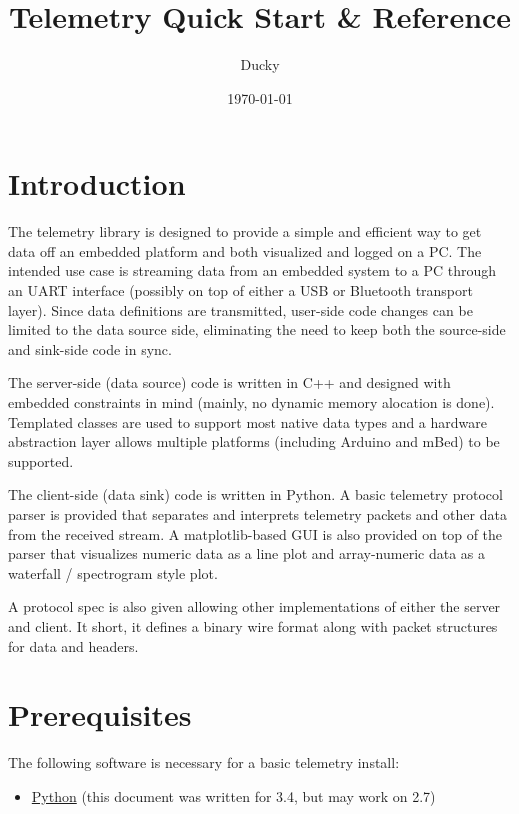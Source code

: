 \documentclass[11pt]{article}
\title{\textbf{Telemetry Quick Start \& Reference}}
\author{Ducky}
\date{\today}
\begin{document}
\maketitle

\section{Introduction}
The telemetry library is designed to provide a simple and efficient way to get data off an embedded platform and both visualized and logged on a PC. The intended use case is streaming data from an embedded system to a PC through an UART interface (possibly on top of either a USB or Bluetooth transport layer). Since data definitions are transmitted, user-side code changes can be limited to the data source side, eliminating the need to keep both the source-side and sink-side code in sync.

The server-side (data source) code is written in C++ and designed with embedded constraints in mind (mainly, no dynamic memory alocation is done). Templated classes are used to support most native data types and a hardware abstraction layer allows multiple platforms (including Arduino and mBed) to be supported.

The client-side (data sink) code is written in Python. A basic telemetry protocol parser is provided that separates and interprets telemetry packets and other data from the received stream. A matplotlib-based GUI is also provided on top of the parser that visualizes numeric data as a line plot and array-numeric data as a waterfall / spectrogram style plot.

A protocol spec is also given allowing other implementations of either the server and client. It short, it defines a binary wire format along with packet structures for data and headers.

\section{Prerequisites}
The following software is necessary for a basic telemetry install:
\begin{itemize}
  \item \href{https://www.python.org/downloads/}{Python} (this document was written for 3.4, but may work on 2.7)
\end{itemize}
\end{document}

